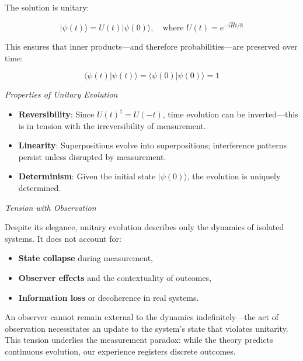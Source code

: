 \documentclass[11pt]{article}
\numberwithin{equation}{section} %
\begin{document}
The solution is unitary:

\begin{equation}
|\psi(t)\rangle = U(t) |\psi(0)\rangle, \quad \text{where } U(t) = e^{-i\hat{H}t/\hbar}
\end{equation}

This ensures that inner products—and therefore probabilities—are preserved over time:

\begin{equation}
\langle \psi(t) | \psi(t) \rangle = \langle \psi(0) | \psi(0) \rangle = 1
\end{equation}

\bigskip

\noindent \textit{Properties of Unitary Evolution}

\begin{itemize}
  \item \textbf{Reversibility}: Since \( U(t)^\dagger = U(-t) \), time evolution can be inverted—this is in tension with the irreversibility of measurement.
  \item \textbf{Linearity}: Superpositions evolve into superpositions; interference patterns persist unless disrupted by measurement.
  \item \textbf{Determinism}: Given the initial state \( |\psi(0)\rangle \), the evolution is uniquely determined.
\end{itemize}

\bigskip

\noindent \textit{Tension with Observation}

Despite its elegance, unitary evolution describes only the dynamics of isolated systems. It does not account for:

\begin{itemize}
  \item \textbf{State collapse} during measurement,
  \item \textbf{Observer effects} and the contextuality of outcomes,
  \item \textbf{Information loss} or decoherence in real systems.
\end{itemize}

An observer cannot remain external to the dynamics indefinitely—the act of observation necessitates an update to the system’s state that violates unitarity. This tension underlies the measurement paradox: while the theory predicts continuous evolution, our experience registers discrete outcomes.

\bigskip
\end{document}
